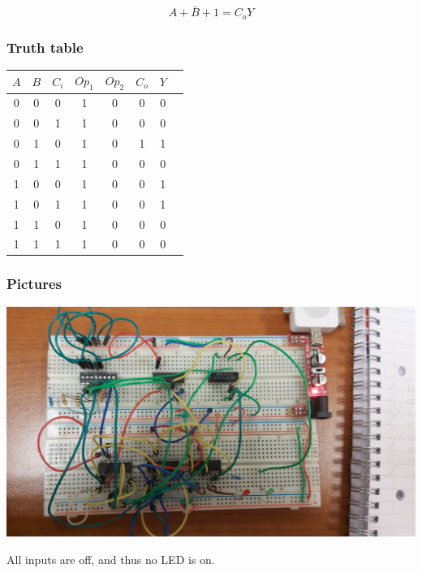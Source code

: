 \documentclass{article}
\begin{document}
\[A+\bar{B}+1 = C_o Y\]

\vspace{9em}

\subsubsection{Truth table}

\begin{center}
	\Large
	\begin{tabular}{c|c|c||c|c||c|c|c}
		$A$ & $B$ & $C_i$ & $Op_1$ & $Op_2$ & $C_{o}$ & $Y$ \\
		\hline
		0 & 0 & 0 & 1 & 0 & 0 & 0 \\
		0 & 0 & 1 & 1 & 0 & 0 & 0 \\
		0 & 1 & 0 & 1 & 0 & 1 & 1 \\
		0 & 1 & 1 & 1 & 0 & 0 & 0 \\
		1 & 0 & 0 & 1 & 0 & 0 & 1 \\
		1 & 0 & 1 & 1 & 0 & 0 & 1 \\
		1 & 1 & 0 & 1 & 0 & 0 & 0 \\
		1 & 1 & 1 & 1 & 0 & 0 & 0 \\
	\end{tabular}
\end{center}


\newpage

\subsubsection{Pictures}


\includegraphics[width=\textwidth]{./figures/00010.jpg}
\begin{center}
	All inputs are off, and thus no LED is on.
\end{center}

\vspace{2em}
\end{document}
